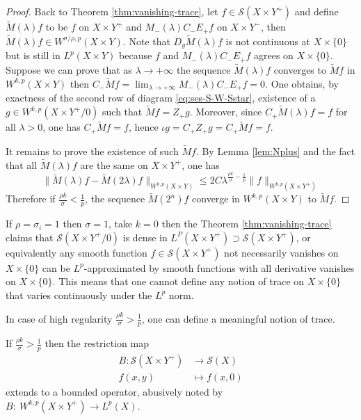 \begin{proof}
Back to Theorem \ref{thm:vanishing-trace}, let \(f\in \mathcal{S}(X\times Y^+)\) and
define \(\tilde M(\lambda) f\) to be \(f\) on \(X\times Y^+\) and
\(M_-(\lambda) C_-E_+ f\) on \(X\times Y^-\), then
\(\tilde M(\lambda)f\in W^{\sigma/\rho,p}(X\times Y)\). Note that
\(D_y \tilde M(\lambda) f\) is not continuous at \(X\times \{0\}\) but is still in
\(L^p(X\times Y)\) because \(f\) and \(M_-(\lambda) C_-E_+ f\) agrees on
\(X\times \{0\}\). Suppose we can prove that as \(\lambda \to +\infty\) the sequence
\(\tilde M(\lambda) f\) converges to \(\tilde M f\) in \(W^{k,p}(X\times Y)\) then
\(C_- \tilde M f = \lim_{\lambda\to +\infty}M_-(\lambda)C_-E_+f=0\). One obtains, by
exactness of the second row of diagram \eqref{eq:ses-S-W-Sstar}, existence of a \(g\in
W^{k,p}(X\times Y^+/0)\) such that \(\tilde M f = Z_+ g\). Moreover, since \(C_+
\tilde M(\lambda) f = f\) for all \(\lambda > 0\), one has \(C_+ \tilde M f = f\), hence \(\iota g = C_+Z_+ g = C_+
\tilde M f = f\).

It remains to prove the existence of such \(\tilde M f\). By Lemma \ref{lem:Nplus} and the
fact that all \(\tilde M(\lambda)f\) are the same on \(X\times Y^+\), one has
\[
\| \tilde M(\lambda)f - \tilde M(2\lambda) f \|_{W^{k,p}(X\times Y)} \leq 2C \lambda^{\frac{\rho
k}{\sigma}-\frac{1}{p} } \|f\|_{W^{k,p}(X\times Y^+)}
\]
Therefore if \(\frac{\rho k}{\sigma}< \frac{1}{p}\), the sequence \(\tilde M (2^n) f\)
converge in \(W^{k,p}(X\times Y)\) to \(\tilde M f\).
\end{proof}

\begin{remark}
\label{ex:vanishing-trace}
If \(\rho=\sigma_i=1\) then \(\sigma=1\), take \(k=0\) then the Theorem
\ref{thm:vanishing-trace} claims that \(\mathcal{S}(X\times Y^+/0)\) is dense in \(L^P(X\times Y^+) \supset \mathcal{S}(X\times Y^+)\), or equivalently any smooth function
\(f\in \mathcal{S}(X\times Y^+)\) not necessarily vanishes on \(X\times \{0\}\) can be
\(L^p\)-approximated by smooth functions with all derivative vanishes on \(X\times
\{0\}\). This means that one cannot define any notion of trace on \(X\times \{0\}\)
that varies continuously under the \(L^p\) norm.
\end{remark}

In case of high regularity \(\frac{\rho k}{\sigma} > \frac{1}{p}\), one can define a
meaningful notion of trace.

\begin{theorem}
\label{thm:def-trace}
If  \(\frac{\rho k}{\sigma} > \frac{1}{p}\) then the restriction map
\begin{align*}
  B: \mathcal{S}(X\times Y^+) &\longrightarrow \mathcal{S}(X)\\
     		f(x,y)	      &\longmapsto     f(x,0)	
\end{align*}
extends to a bounded operator, abusively noted by \(B:\ W^{k,p}(X\times Y^+) \longrightarrow L^p(X)\).
\end{theorem}

